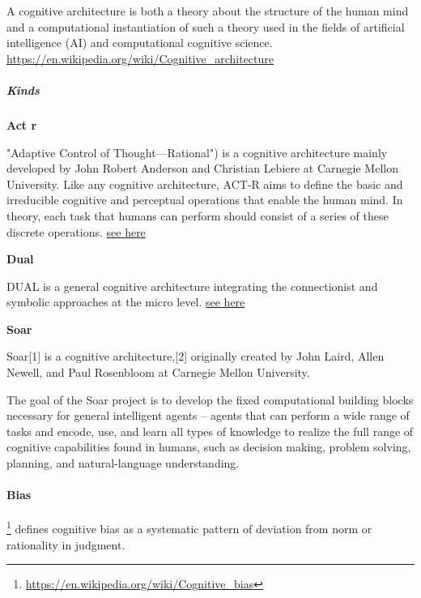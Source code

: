 \documentclass{book}
\newcommand{\seehere}[1]{\href{#1}{see here}}
\providecommand{\ProjectDeepHeading}[2]{%
    \par\medskip\noindent\textbf{#2}\par\smallskip
}
\providecommand{\seehere}[1]{\href{#1}{see here}}
\providecommand{\clickurlfooter}[1]{\footnote{\url{#1}}}
\begin{document}
A cognitive architecture is both a theory about the structure of the human mind and a computational instantiation of such a theory used in the fields of artificial intelligence (AI) and computational cognitive science. \url{https://en.wikipedia.org/wiki/Cognitive_architecture}

\subparagraph{Kinds}

\ProjectDeepHeading{1}{Act r}


"Adaptive Control of Thought—Rational") is a cognitive architecture mainly developed by John Robert Anderson and Christian Lebiere at Carnegie Mellon University. Like any cognitive architecture, ACT-R aims to define the basic and irreducible cognitive and perceptual operations that enable the human mind. In theory, each task that humans can perform should consist of a series of these discrete operations. \seehere{https://en.wikipedia.org/wiki/ACT-R}
% 
%

\ProjectDeepHeading{1}{Dual}


DUAL is a general cognitive architecture integrating the connectionist and symbolic approaches at the micro level. \seehere{https://en.wikipedia.org/wiki/DUAL_(cognitive_architecture)}

\ProjectDeepHeading{1}{Soar}


Soar[1] is a cognitive architecture,[2] originally created by John Laird, Allen Newell, and Paul Rosenbloom at Carnegie Mellon University.
    
    The goal of the Soar project is to develop the fixed computational building blocks necessary for general intelligent agents – agents that can perform a wide range of tasks and encode, use, and learn all types of knowledge to realize the full range of cognitive capabilities found in humans, such as decision making, problem solving, planning, and natural-language understanding. \url{}

\paragraph{Bias}


\clickurlfooter{https://en.wikipedia.org/wiki/Cognitive_bias} defines cognitive bias as a systematic pattern of deviation from norm or rationality in judgment.
    
\end{document}
